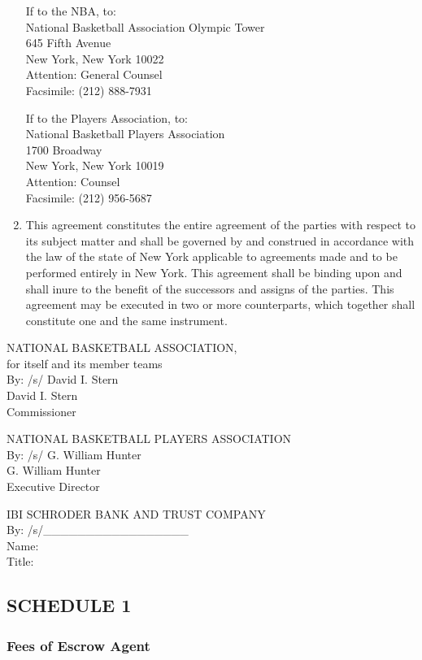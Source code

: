 \documentclass[
]{book}
\begin{document}
\begin{enumerate}
  If to the NBA, to:\\
  National Basketball Association Olympic Tower\\
  645 Fifth Avenue\\
  New York, New York 10022\\
  Attention: General Counsel\\
  Facsimile: (212) 888-7931

  If to the Players Association, to:\\
  National Basketball Players Association\\
  1700 Broadway\\
  New York, New York 10019\\
  Attention: Counsel\\
  Facsimile: (212) 956-5687
\item
  This agreement constitutes the entire agreement of the parties with respect to its subject matter and shall be governed by and construed in accordance with the law of the state of New York applicable to agreements made and to be performed entirely in New York. This agreement shall be binding upon and shall inure to the benefit of the successors and assigns of the parties. This agreement may be executed in two or more counterparts, which together shall constitute one and the same instrument.
\end{enumerate}

NATIONAL BASKETBALL ASSOCIATION,\\
for itself and its member teams\\
By: /s/ David I. Stern\\
David I. Stern\\
Commissioner

NATIONAL BASKETBALL PLAYERS ASSOCIATION\\
By: /s/ G. William Hunter\\
G. William Hunter\\
Executive Director

IBI SCHRODER BANK AND TRUST COMPANY\\
By: /s/\_\_\_\_\_\_\_\_\_\_\_\_\_\_\_\_\_\\
Name:\\
Title:

\hypertarget{schedule-1}{%
\subsection{SCHEDULE 1}\label{schedule-1}}

\hypertarget{fees-of-escrow-agent}{%
\subsubsection{Fees of Escrow Agent}\label{fees-of-escrow-agent}}
\end{document}

